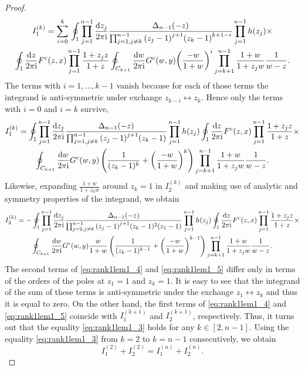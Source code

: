 \documentclass[cmp]{svjour}
\numberwithin{theorem}{section}
\numberwithin{equation}{section}
\def\dd{{\rm d}}
\def\ii{{\rm i}}
\begin{document}
\begin{proof}
\begin{multline*}
I_1^{(k)} =  \sum_{i=0}^{k}{} \oint_{1} \prod_{j=1}^{n-1}{ \frac{\dd z_j}{2 \pi \ii} } \frac{ \Delta_{n-1}(-z)}{ \prod_{j=1, j \neq k}^{n-1}{{(z_j -1)}^{j+1}} {(z_{k} -1 )}^{k+1 - i}  } \prod_{j=1}^{n-1}{h(z_j)} \times \\ \oint_{1} \frac{\dd z}{2 \pi \ii} F^c(z, x) \prod_{j=1}^{n-1}{ \frac{1 + z_j z}{1 + z} } 
 \oint_{C_{k+1} } \frac{\dd w}{2 \pi \ii} G^c(w, y)  {\left( \frac{-w}{1 + w} \right)}^i  \prod_{j=k+1}^{n-1}{\frac{1 + w}{1 + z_j w}}  \frac{1}{w-z}.
\end{multline*}
The terms with $i=1,\ldots, k-1$ vanish because for each of those terms the integrand is anti-symmetric under exchange $z_{k-i} \leftrightarrow z_{k}$. Hence only the terms with $i=0$ and $i=k$ survive,
\begin{multline}
\label{eq:rank1lem1_4}
I_1^{(k)}  =  \oint_{1} \prod_{j=1}^{n-1}{ \frac{\dd z_j}{2 \pi \ii} } \frac{ \Delta_{n-1}(-z)}{ \prod_{j=1, j \neq k}^{n-1}{{(z_j -1)}^{j+1}}  (z_{k}-1) } \prod_{j=1}^{n-1}{h(z_j)} \oint_{1} \frac{\dd z}{2 \pi \ii} F^c(z, x) \prod_{j=1}^{n-1}{ \frac{1 + z_j z}{1 + z} } \times \\
\oint_{C_{k+1} } \frac{\dd w}{2 \pi \ii} G^c(w, y)   \left( \frac{1}{(z_{k}-1)^{k}} +\left( \frac{-w}{1 + w} \right)^{k}  \right) \prod_{j=k+1}^{n-1}{\frac{1 + w}{1 + z_j w}}  \frac{1}{w-z}.
\end{multline}
%
Likewise, expanding $ \frac{1 + w}{1 + z_{k} w}$ around $z_{k}=1$  in $I_2^{(k)}$ and making use of analytic and symmetry properties of the integrand, we obtain
%
\begin{multline}
\label{eq:rank1lem1_5}
I_2^{(k)} =  - \oint_{1} \prod_{j=1}^{n-1}{ \frac{\dd z_j}{2 \pi \ii} } \frac{ \Delta_{n-1}(-z) }{ \prod_{j=2,  j \neq k}^{n-1}{{(z_j -1)}^{j+1}} (z_{k}-1)^2 (z_1-1) } \prod_{j=1}^{n-1}{h(z_j)} \oint_{1} \frac{\dd z}{2 \pi \ii} F^c(z, x) \prod_{j=1}^{n-1}{ \frac{1 + z_j z}{1 + z} } \times \\
\oint_{C_{k+1}} \frac{\dd w}{2 \pi \ii} G^c(w, y) \frac{w}{1+w} \left(  \frac{1}{(z_{k}-1)^{k-1}} + \left(\frac{-w}{1 + w} \right)^{k-1}  \right) \prod_{j=k+1}^{n-1}{\frac{1 + w}{1 + z_j w}}  \frac{1}{w-z} .
\end{multline}
The second terms of \eqref{eq:rank1lem1_4} and \eqref{eq:rank1lem1_5} differ only in terms of the orders of the poles at $z_1=1$ and $z_k=1$. It is easy to see that the integrand of the sum of these terms is anti-symmetric under the exchange $z_1 \leftrightarrow z_{k}$ and thus it is equal to zero.
On the other hand, the first terms of  \eqref{eq:rank1lem1_4} and \eqref{eq:rank1lem1_5} coincide with $I_1^{(k+1)}$ and $I_2^{(k+1)}$, respectively.
Thus, it turns out that the equality \eqref{eq:rank1lem1_3} holds for any $k \in [2,n-1]$.
Using the equality \eqref{eq:rank1lem1_3} from $k=2$ to $k=n-1$ consecutively, we obtain
%
\begin{equation*}
\label{eq:rank1lem1_7}
I_1^{(2)} + I_2^{(2)} = I_1^{(n)} + I_2^{(n)}.
\end{equation*}



\end{proof}
\end{document}
